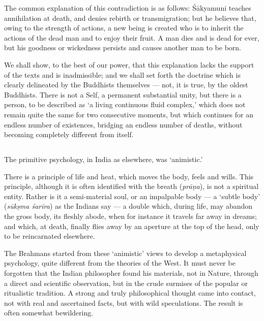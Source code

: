 \documentclass[a4paper, 11pt, oneside, english, landscape]{article}
\begin{document}
The common explanation of this contradiction is as follows: Śākyamuni teaches annihilation at death, and denies rebirth or transmigration; but he believes that, owing to the strength of actions, a new being is created who is to inherit the actions of the dead man and to enjoy their fruit. A man dies and is dead for ever, but his goodness or wickedness persists and causes another man to be born.

We shall show, to the best of our power, that this explanation lacks the support of the texts and is inadmissible; and we shall set forth the doctrine which is clearly delineated by the Buddhists themselves --- not, it is true, by the oldest Buddhists. There is not a Self, a permanent substantial unity, but there is a person, to be described as `a living continuous fluid complex,' which does not remain quite the same for two consecutive moments, but which continues for an endless number of existences, bridging an endless number of deaths, without becoming completely different from itself.

\subsection{}
\paragraph{}
The primitive psychology, in India as elsewhere, was `animistic.'

There is a principle of life and heat, which moves the body, feels and wills. This principle, although it is often identified with the breath (\emph{prāṇa}), is not a spiritual entity. Rather is it a semi-material soul, or an impalpable body --- a `subtle body' (\emph{sūkṣma śarīra}) as the Indians say --- a double which, during life, may abandon the gross body, its fleshly abode, when for instance it travels far away in dreams; and which, at death, finally flies away by an aperture at the top of the head, only to be reincarnated elsewhere.

The Brahmans started from these `animistic' views to develop a metaphysical psychology, quite different from the theories of the West. It must never be forgotten that the Indian philosopher found his materials, not in Nature, through a direct and scientific observation, but in the crude surmises of the popular or ritualistic tradition. A strong and truly philosophical thought came into contact, not with real and ascertained facts, but with wild speculations. The result is often somewhat bewildering.
\end{document}
